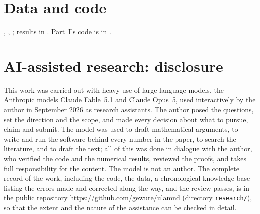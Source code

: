 \documentclass[11pt,a4paper]{article}
\theoremstyle{remark}\newtheorem{remark}[theorem]{Remark}
\begin{document}
\section*{Data and code}
, ,
; results in . Part~I's code is in .

\section*{AI-assisted research: disclosure}
This work was carried out with heavy use of large language models, the Anthropic models Claude Fable~5.1 and
Claude Opus~5, used interactively by the author in September 2026 as research assistants. The author posed the questions, set the
direction and the scope, and made every decision about what to pursue, claim and submit. The model was used to draft
mathematical arguments, to write and run the software behind every number in the paper, to search the literature,
and to draft the text; all of this was done in dialogue with the author, who verified the code and the numerical
results, reviewed the proofs, and takes full responsibility for the content. The model is not an author. The
complete record of the work, including the code, the data, a chronological knowledge base listing the errors made
and corrected along the way, and the review passes, is in the public repository
\url{https://github.com/gewure/ulamnd} (directory \texttt{research/}), so that the extent and the nature of the
assistance can be checked in detail.



\end{document}
